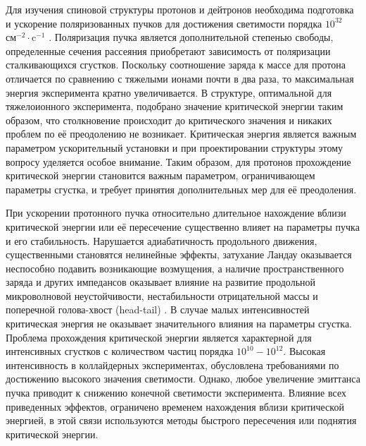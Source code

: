 \par	Для изучения спиновой структуры протонов и дейтронов необходима подготовка и ускорение поляризованных пучков для достижения светимости порядка $10^{32}$ $\text{см}^{-2}\cdot\text{c}^{-1}$ \autocite{RHIC_luminosity}. Поляризация пучка является дополнительной степенью свободы, определенные сечения рассеяния приобретают зависимость от поляризации сталкивающихся сгустков. Поскольку соотношение заряда к массе для протона отличается по сравнению с тяжелыми ионами почти в два раза, то максимальная энергия эксперимента кратно увеличивается. В структуре, оптимальной для тяжелоионного эксперимента, подобрано значение критической энергии таким образом, что столкновение происходит до критического значения и никаких проблем по её преодолению не возникает. Критическая энергия является важным параметром ускорительный установки и при проектировании структуры этому вопросу уделяется особое внимание. Таким образом, для протонов прохождение критической энергии становится важным параметром, ограничивающем параметры сгустка, и требует принятия дополнительных мер для её преодоления.

\par	При ускорении протонного пучка относительно длительное нахождение вблизи критической энергии или её пересечение существенно влияет на параметры пучка и его стабильность. Нарушается адиабатичность продольного движения, существенными становятся нелинейные эффекты, затухание Ландау оказывается неспособно подавить возникающие возмущения, а наличие пространственного заряда и других импедансов оказывает влияние на развитие продольной микроволновой неустойчивости, нестабильности отрицательной массы и поперечной голова-хвост (head-tail) \autocite{ng, lee}. В случае малых интенсивностей критическая энергия не оказывает значительного влияния на параметры сгустка. Проблема прохождения критической энергии является характерной для интенсивных сгустков с количеством частиц порядка $10^{10}-10^{12}$. Высокая интенсивность в коллайдерных экспериментах, обусловлена требованиями по достижению высокого значения светимости. Однако, любое увеличение эмиттанса пучка приводит к снижению конечной светимости эксперимента. Влияние всех приведенных эффектов, ограничено временем нахождения вблизи критической энергией, в этой связи используются методы быстрого пересечения или поднятия критической энергии.

